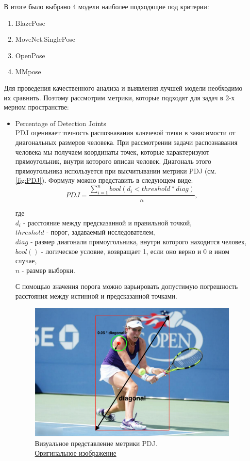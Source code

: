 В итоге было выбрано 4 модели наиболее подходящие под критерии:
\begin{enumerate}
	\item BlazePose
	\item MoveNet.SinglePose
	\item OpenPose
	\item MMpose
\end{enumerate}

Для проведения качественного анализа и выявления лучшей модели необходимо их сравнить. Поэтому рассмотрим метрики, которые подходят для задач в 2-х мерном пространстве:

\begin{itemize}
	\item Percentage of Detection Joints\\
	PDJ оценивает точность распознавания ключевой точки в зависимости от диагональных размеров человека. При рассмотрении задачи распознавания человека мы получаем координаты точек, которые характеризуют прямоугольник, внутри которого вписан человек. Диагональ этого прямоугольника используется при высчитывании метрики PDJ (см. \autoref{fig:PDJ}). Формулу можно представить в следующем виде:
	\begin{equation}
		PDJ = \frac{\sum_{i=1}^{n} bool(d_i < threshold * diag)}{n},
	\end{equation}
	
	где\\
	$d_i$ - расстояние между предсказанной и правильной точкой,\\
	$threshold$ - порог, задаваемый исследователем,\\
	$diag$ - размер диагонали прямоугольника, внутри которого находится человек,\\
	$bool()$ - логическое условие, возвращает 1, если оно верно и 0 в ином случае,\\
	$n$ - размер выборки.
	
	С помощью значения порога можно варьировать допустимую погрешность расстояния между истинной и предсказанной точками.
	\begin{figure}[h]
		\centering
		\includegraphics[width=\textwidth * 4 / 5]{./images/PDJ}
		\caption{Визуальное представление метрики PDJ.\\ \href{https://miro.medium.com/max/1400/1*dJhVudwq7pb_xl3yPEH37Q.jpeg}{Оригинальное изображение}}
		\label{fig:PDJ}
	\end{figure}


\end{itemize}
